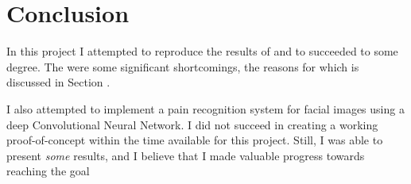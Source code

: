 \documentclass[Main]{subfiles}
\begin{document}
\section{Conclusion} %
	\label{sec:conclusion}
	In this project I attempted to reproduce the results of  and to succeeded to some degree. 
	The were some significant shortcomings, the reasons for which is discussed in Section .

	I also attempted to implement a pain recognition system for facial images using a deep Convolutional Neural Network.
	I did not succeed in creating a working proof-of-concept within the time available for this project.
	Still, I was able to present \emph{some} results, and I believe that I made valuable progress towards reaching the goal

\end{document}
